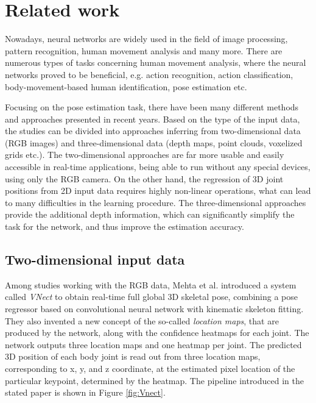 
\chapter{Related work}\label{chap:related work}

Nowadays, neural networks are widely used in the field of image processing, pattern recognition, human movement analysis and many more. There are numerous types of tasks concerning human movement analysis, where the neural networks proved to be beneficial, e.g. action recognition, action classification, body-movement-based human identification, pose estimation etc.\par
\vspace{5mm}
\noindent Focusing on the pose estimation task, there have been many different methods and approaches presented in recent years. Based on the type of the input data, the studies can be divided into approaches inferring from two-dimensional data (RGB images) and three-dimensional data (depth maps, point clouds, voxelized grids etc.). The two-dimensional approaches are far more usable and easily accessible in real-time applications, being able to run without any special devices, using only the RGB camera. On the other hand, the regression of 3D joint positions from 2D input data requires highly non-linear operations, what can lead to many difficulties in the learning procedure. The three-dimensional approaches provide the additional depth information, which can significantly simplify the task for the network, and thus improve the estimation accuracy.

\section{Two-dimensional input data}
\noindent Among studies working with the RGB data, Mehta et al. \cite{VNect_SIGGRAPH2017} introduced a system called \textit{VNect} to obtain real-time full global 3D skeletal pose, combining a pose regressor based on convolutional neural network with kinematic skeleton fitting. They also invented a new concept of the so-called \textit{location maps}, that are produced by the network, along with the confidence heatmaps for each joint. The network outputs three location maps and one heatmap per joint. The predicted 3D position of each body joint is read out from three location maps, corresponding to x, y, and z coordinate, at the estimated pixel location of the particular keypoint, determined by the heatmap. The pipeline introduced in the stated paper is shown in Figure \ref{fig:Vnect}.\par

